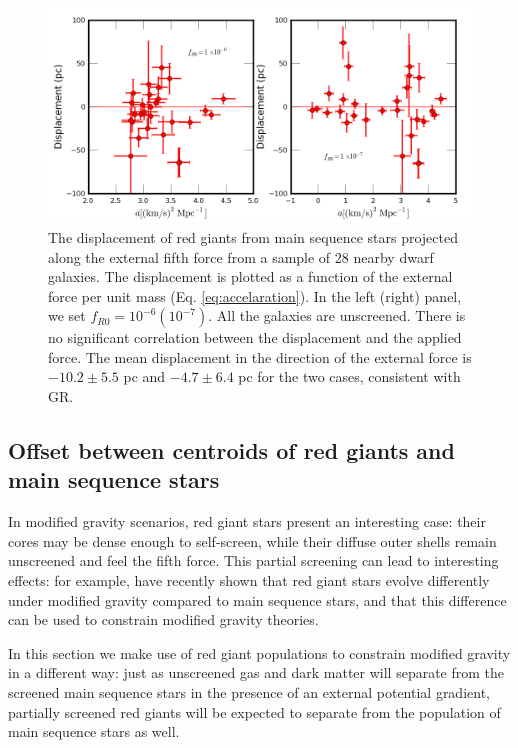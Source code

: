 \documentclass{emulateapj}
\begin{document}
\begin{figure}
\begin{center}
\includegraphics[scale=0.5]{figures/dispprojforce.png}
  \caption{The displacement of red giants from main sequence stars projected along 
the external fifth force from a sample of 28 nearby dwarf galaxies. The displacement is plotted as a function of the external force per unit mass
(Eq. \ref{eq:accelaration}). 
In the left (right) panel, we set $f_{R0}=10^{-6} (10^{-7})$. 
All the galaxies are unscreened. There is no significant correlation between
the
displacement and the applied force.
 The mean displacement in the direction of the 
external force is $-10.2\pm5.5$ pc  and $-4.7\pm6.4$ pc for
the two cases, consistent with GR. 
\label{fig:rgdispprojforce}}
\end{center}
\end{figure}


\subsection{Offset between centroids of red giants and main sequence stars}
\label{sec:rgb}
In modified gravity scenarios, red giant stars present an interesting case:
their cores may be dense enough to self-screen, while their diffuse outer
shells remain unscreened and feel the fifth force.  This partial screening
can lead to interesting effects: for example, 
\citet{changhui} have recently shown that red giant stars evolve differently
under modified gravity compared to main sequence stars, and that this
difference can be used to constrain modified gravity theories.

In this section we make use of red giant populations
to constrain modified gravity in a different way:
just as unscreened gas and dark matter will separate from
the screened main sequence stars in the presence
of an external potential gradient, partially screened red giants
will be expected to separate from the population
of main sequence stars as well.
\end{document}
